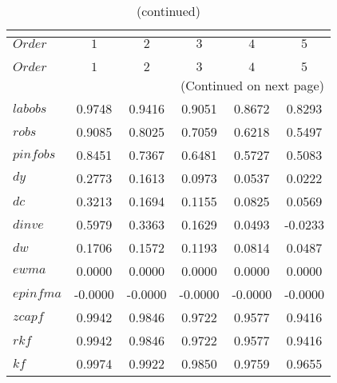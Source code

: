  
\begin{center}
\begin{longtable}{lccccc} 
\caption{COEFFICIENTS OF AUTOCORRELATION}\\
 \label{Table:th_autocorr_matrix}\\
\toprule 
$Order    $	 & 	 $          1$	 & 	 $          2$	 & 	 $          3$	 & 	 $          4$	 & 	 $          5$\\
\midrule \endfirsthead 
\caption{(continued)}\\
 \toprule \\ 
$Order    $	 & 	 $          1$	 & 	 $          2$	 & 	 $          3$	 & 	 $          4$	 & 	 $          5$\\
\midrule \endhead 
\midrule \multicolumn{6}{r}{(Continued on next page)} \\ \bottomrule \endfoot 
\bottomrule \endlastfoot 
$labobs   $	 & 	     0.9748	 & 	     0.9416	 & 	     0.9051	 & 	     0.8672	 & 	     0.8293 \\ 
$robs     $	 & 	     0.9085	 & 	     0.8025	 & 	     0.7059	 & 	     0.6218	 & 	     0.5497 \\ 
$pinfobs  $	 & 	     0.8451	 & 	     0.7367	 & 	     0.6481	 & 	     0.5727	 & 	     0.5083 \\ 
$dy       $	 & 	     0.2773	 & 	     0.1613	 & 	     0.0973	 & 	     0.0537	 & 	     0.0222 \\ 
$dc       $	 & 	     0.3213	 & 	     0.1694	 & 	     0.1155	 & 	     0.0825	 & 	     0.0569 \\ 
$dinve    $	 & 	     0.5979	 & 	     0.3363	 & 	     0.1629	 & 	     0.0493	 & 	    -0.0233 \\ 
$dw       $	 & 	     0.1706	 & 	     0.1572	 & 	     0.1193	 & 	     0.0814	 & 	     0.0487 \\ 
$ewma     $	 & 	     0.0000	 & 	     0.0000	 & 	     0.0000	 & 	     0.0000	 & 	     0.0000 \\ 
$epinfma  $	 & 	    -0.0000	 & 	    -0.0000	 & 	    -0.0000	 & 	    -0.0000	 & 	    -0.0000 \\ 
$zcapf    $	 & 	     0.9942	 & 	     0.9846	 & 	     0.9722	 & 	     0.9577	 & 	     0.9416 \\ 
$rkf      $	 & 	     0.9942	 & 	     0.9846	 & 	     0.9722	 & 	     0.9577	 & 	     0.9416 \\ 
$kf       $	 & 	     0.9974	 & 	     0.9922	 & 	     0.9850	 & 	     0.9759	 & 	     0.9655 \\ 

\end{longtable}
\end{center}
